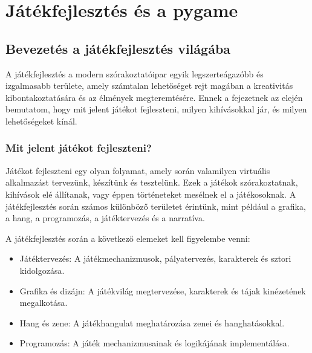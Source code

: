 \chapter{Játékfejlesztés és a pygame}

\section{Bevezetés a játékfejlesztés világába}

 A játékfejlesztés a modern szórakoztatóipar egyik legszerteágazóbb és izgalmasabb területe, amely számtalan lehetőséget rejt magában a kreativitás kibontakoztatására és az élmények megteremtésére. Ennek a fejezetnek az elején bemutatom, hogy mit jelent játékot fejleszteni, milyen kihívásokkal jár, és milyen lehetőségeket kínál.

\subsection{Mit jelent játékot fejleszteni?}
 Játékot fejleszteni egy olyan folyamat, amely során valamilyen virtuális alkalmazást tervezünk, készítünk és tesztelünk. Ezek a játékok szórakoztatnak, kihívások elé állítanak, vagy éppen történeteket mesélnek el a játékosoknak. A játékfejlesztés során számos különböző területet érintünk, mint például a grafika, a hang, a programozás, a játéktervezés és a narratíva.

A játékfejlesztés során a következő elemeket kell figyelembe venni:

\begin{itemize}
    \item Játéktervezés: A játékmechanizmusok, pályatervezés, karakterek és sztori kidolgozása.
    \item Grafika és dizájn: A játékvilág megtervezése, karakterek és tájak kinézetének megalkotása.
    \item Hang és zene: A játékhangulat meghatározása zenei és hanghatásokkal.
    \item Programozás: A játék mechanizmusainak és logikájának implementálása.
\end{itemize}
